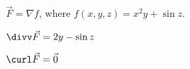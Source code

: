 {$\vec F = \nabla f$, where $f(x,y,z) = x^2y+\sin z$.
}
{$\divv \vec F = 2y-\sin z$

$\curl\vec F = \vec 0$
}
